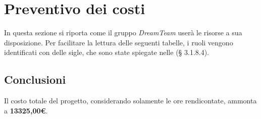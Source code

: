 \section{Preventivo dei costi}
In questa sezione si riporta come il gruppo \textit{DreamTeam} userà le risorse a sua disposizione. Per facilitare la lettura delle seguenti tabelle, i ruoli vengono identificati con delle sigle, che sono state spiegate nelle \textit{\NdP} (§ 3.1.8.4).


\pagebreak

\pagebreak

\pagebreak

\pagebreak


\subsection{Conclusioni}
Il costo totale del progetto, considerando solamente le ore rendicontate, ammonta a \textbf{13325,00\euro}.

\pagebreak
